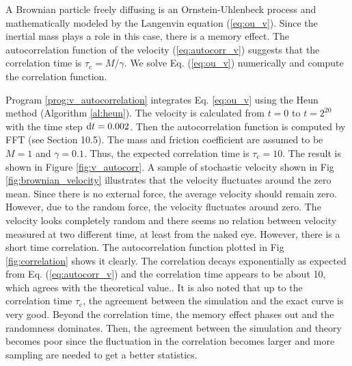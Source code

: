 \bigskip
\begin{example}

A Brownian particle freely diffusing  is an Ornstein-Uhlenbeck process and mathematically modeled by the Langenvin equation (\ref{eq:ou_v}).  Since the inertial mass plays a role in this case, there is a memory effect. The autocorrelation function of the velocity  (\ref{eq:autocorr_v}) suggests that the correlation time is $\tau_\text{c}=M/\gamma$.  We solve Eq. (\ref{eq:ou_v}) numerically and compute the correlation function.

Program \ref{prog:v_autocorrelation} integrates Eq. \ref{eq:ou_v} 
using the Heun method (Algorithm \ref{al:heun}).  The velocity is calculated from $t=0$ to $t=2^20$ with the time step $\text{d} t=0.002$.  Then the autocorrelation function is computed by FFT (see Section 10.5).  The mass and friction coefficient are assumed to be $M=1$ and $\gamma=0.1$.  Thus, the expected correlation time is $\tau_\text{c}=10$. The result is shown in Figure \ref{fig:v_autocorr}. A sample of stochastic velocity shown in Fig \ref{fig:brownian_velocity} illustrates that the velocity fluctuates around the zero mean.  Since there is no external force, the average velocity should remain zero.  However, due to the random force, the velocity fluctuates around zero.  The velocity looks completely random and there seems no relation between velocity measured at two different time, at least from the naked eye.  However, there is a short time correlation.  The autocorrelation function plotted in Fig \ref{fig:correlation} shows it clearly.  The correlation decays exponentially as expected from Eq. (\ref{eq:autocorr_v}) and  the correlation time appears to be about 10, which agrees with the theoretical value..  It is also noted that up to the correlation time $\tau_\text{c}$, the agreement between the simulation and the exact curve is very good.  Beyond the correlation time, the memory effect phases out and the randomness dominates.  Then, the agreement between the simulation and theory becomes poor since the fluctuation in the correlation becomes larger and more sampling are needed to get a better statistics.
\end{example}


